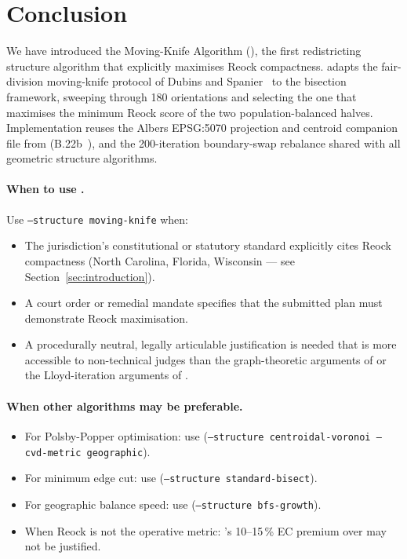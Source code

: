 \section{Conclusion}
\label{sec:conclusion}

We have introduced the Moving-Knife Algorithm (\mka{}), the first redistricting
structure algorithm that explicitly maximises Reock compactness.
\mka{} adapts the fair-division moving-knife protocol of Dubins and
Spanier~\citeyear{dubins1961} to the bisection framework, sweeping through 180
orientations and selecting the one that maximises the minimum Reock score of
the two population-balanced halves.
Implementation reuses the Albers EPSG:5070 projection and centroid companion
file from \cvdgeo{} (B.22b~\citep{dellaLibera2026cvdgeo}), and the 200-iteration
boundary-swap rebalance shared with all geometric structure algorithms.

\paragraph{When to use \mka{}.}
Use \texttt{--structure moving-knife} when:
\begin{itemize}
\item The jurisdiction's constitutional or statutory standard explicitly
  cites Reock compactness (North Carolina, Florida, Wisconsin --- see
  Section~\ref{sec:introduction}).
\item A court order or remedial mandate specifies that the submitted plan
  must demonstrate Reock maximisation.
\item A procedurally neutral, legally articulable justification is needed
  that is more accessible to non-technical judges than the graph-theoretic
  arguments of \metis{} or the Lloyd-iteration arguments of \cvdgeo{}.
\end{itemize}

\paragraph{When other algorithms may be preferable.}
\begin{itemize}
\item For Polsby-Popper optimisation: use \cvdgeo{}
  (\texttt{--structure centroidal-voronoi --cvd-metric geographic}).
\item For minimum edge cut: use \metis{}
  (\texttt{--structure standard-bisect}).
\item For geographic balance speed: use \bfsg{}
  (\texttt{--structure bfs-growth}).
\item When Reock is not the operative metric: \mka{}'s 10--15\,\% EC premium
  over \cvdgeo{} may not be justified.
\end{itemize}

